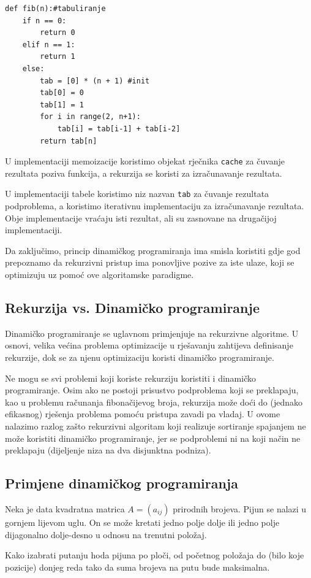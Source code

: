 \begin{verbatim}  
def fib(n):#tabuliranje
	if n == 0:
		return 0
	elif n == 1:
		return 1
	else:
		tab = [0] * (n + 1) #init
		tab[0] = 0
		tab[1] = 1
		for i in range(2, n+1):
			tab[i] = tab[i-1] + tab[i-2]
		return tab[n]
\end{verbatim}
U implementaciji memoizacije koristimo objekat rječnika \texttt{cache} za čuvanje rezultata poziva funkcija, a rekurzija se koristi za izračunavanje rezultata.

U implementaciji tabele koristimo niz nazvan \texttt{tab} za čuvanje rezultata podproblema, a koristimo iterativnu implementaciju za izračunavanje rezultata. Obje implementacije vraćaju isti rezultat, ali su zasnovane na drugačijoj implementaciji. %

Da zaključimo, princip dinamičkog programiranja ima smisla koristiti gdje god prepoznamo da rekurzivni pristup ima ponovljive pozive za iste ulaze, koji se optimizuju uz pomoć ove algoritamske paradigme.

\subsection{Rekurzija vs. Dinamičko programiranje}


Dinamičko programiranje se uglavnom primjenjuje na rekurzivne algoritme.  U  osnovi, velika većina problema optimizacije u rješavanju zahtijeva definisanje rekurzije, dok se za njenu  optimizaciju koristi dinamičko programiranje.

Ne mogu se svi problemi koji koriste rekurziju koristiti i dinamičko programiranje. Osim ako ne postoji prisustvo podproblema koji se preklapaju,  kao u problemu računanja fibonačijevog broja, rekurzija može doći do (jednako efikasnog) rješenja problema pomoću pristupa zavadi pa vladaj. U ovome nalazimo  razlog zašto rekurzivni algoritam koji realizuje  sortiranje spajanjem ne može koristiti dinamičko programiranje, jer se podproblemi ni na koji način ne preklapaju (dijeljenje niza na dva disjunktna podniza).


\subsection{Primjene dinamičkog programiranja}

\begin{example}
	Neka je data kvadratna matrica $A=(a_{ij})$ prirodnih brojeva. Pijun se nalazi u gornjem lijevom uglu. On se može kretati jedno polje dolje ili jedno polje dijagonalno dolje-desno u odnosu na trenutni položaj. 
	
	
	Kako izabrati putanju hoda pijuna po ploči, od početnog položaja do (bilo koje pozicije) donjeg reda tako da suma brojeva na putu bude maksimalna.
\end{example}

